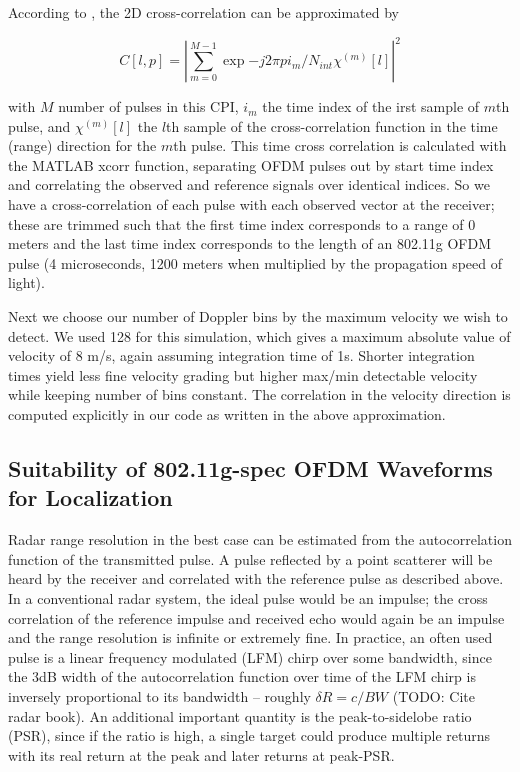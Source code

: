 \documentclass[article,11pt,onecolumn,final]{IEEEtran}
\begin{document}
According to \cite{Colone2012}, the 2D cross-correlation can be approximated by

\begin{equation} \label{eq:2dccapprox}
 C[l, p] = |\sum\limits_{m=0}^{M-1}\exp{-j2\pi pi_m/N_{int}}\chi^{(m)}[l]|^2 
\end{equation}

with $M$ number of pulses in this CPI, $i_m$ the time index of the irst sample of $m$th pulse, and $\chi^{(m)}[l]$ the $l$th sample of the cross-correlation function in the time (range) direction for the $m$th pulse. This time cross correlation is calculated with the MATLAB xcorr function, separating OFDM pulses out by start time index and correlating the observed and reference signals over identical indices. So we have a cross-correlation of each pulse with each observed vector at the receiver; these are trimmed such that the first time index corresponds to a range of 0 meters and the last time index corresponds to the length of an 802.11g OFDM pulse (4 microseconds, 1200 meters when multiplied by the propagation speed of light).

Next we choose our number of Doppler bins by the maximum velocity we wish to detect. We used 128 for this simulation, which gives a maximum absolute value of velocity of 8 m/s, again assuming integration time of 1s. Shorter integration times yield less fine velocity grading but higher max/min detectable velocity while keeping number of bins constant. The correlation in the velocity direction is computed explicitly in our code as written in the above approximation.

\subsection{Suitability of 802.11g-spec OFDM Waveforms for Localization}
Radar range resolution in the best case can be estimated from the autocorrelation function of the transmitted pulse. A pulse reflected by a point scatterer will be heard by the receiver and correlated with the reference pulse as described above. In a conventional radar system, the ideal pulse would be an impulse; the cross correlation of the reference impulse and received echo would again be an impulse and the range resolution is infinite or extremely fine. In practice, an often used pulse is a linear frequency modulated (LFM) chirp over some bandwidth, since the 3dB width of the autocorrelation function over time of the LFM chirp is inversely proportional to its bandwidth -- roughly $\delta R = c / BW$ (TODO: Cite radar book). An additional important quantity is the peak-to-sidelobe ratio (PSR), since if the ratio is high, a single target could produce multiple returns with its real return at the peak and later returns at peak-PSR.
\end{document}
